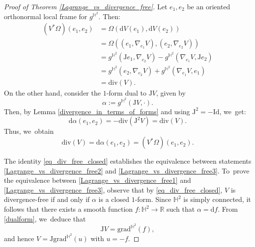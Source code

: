 \documentclass[JEP,XML,SOM,Unicode,NoEqCountersInSection, NoFloatCountersInSection,published]{cedram}
\theoremstyle{plain}
\theoremstyle{definition}
\begin{document}
\begin{proof}[Proof of Theorem \ref{Lagrange_vs_divergence_free}]
Let \(e_1, e_2 \) be an oriented orthonormal local frame for \(g^{\mathbb{H}^2} \). Then:
\begin{align*}
(V^*\Omega)(e_1, e_2)
&= \Omega(\mathrm{d}V(e_1), \mathrm{d}V(e_2)) \\
&= \Omega((e_1, \nabla_{e_1}V), (e_2, \nabla_{e_2}V)) \\
&= g^{\mathbb{H}^2}(\mathrm{J}e_1, \nabla_{e_2}V) - g^{\mathbb{H}^{2}}(\nabla_{e_1}V, \mathrm{J}e_2) \\
&= g^{\mathbb{H}^2}(e_2, \nabla_{e_2}V) + g^{\mathbb{H}^{2}}(\nabla_{e_1}V, e_1) \\
&= \mathrm{div}(V).
\end{align*}
On the other hand, consider the $1$-form dual to \(\mathrm{J}V \), given by
\begin{equation}\label{dualform}
\alpha := g^{\mathbb{H}^2}(\mathrm{J}V, \cdot).
\end{equation}
Then, by Lemma \ref{divergence_in_terms_of_forms} and using \(\mathrm{J}^2 = -\mathrm{Id} \), we~get:
\[
\mathrm{d}\alpha(e_1, e_2) = -\mathrm{div}(\mathrm{J}^2 V) = \mathrm{div}(V).
\]
Thus, we~obtain
\begin{equation}\label{eq_div_free_closed}
\mathrm{div}(V) = \mathrm{d}\alpha(e_1, e_2) = (V^*\Omega)(e_1, e_2).
\end{equation}

The identity \eqref{eq_div_free_closed} establishes the equivalence between statements \eqref{Lagrange_vs_divergence_free2} and \eqref{Lagrange_vs_divergence_free3}. To~prove the equivalence between \eqref{Lagrange_vs_divergence_free1} and \eqref{Lagrange_vs_divergence_free3}, observe that by \eqref{eq_div_free_closed}, \(V \) is divergence-free if and only if \(\alpha \) is a closed $1$-form. Since \(\mathbb{H}^2 \) is simply connected, it follows that there exists a smooth function \(f: \mathbb{H}^2 \to \mathbb{R} \) such that \(\alpha = \mathrm{d}f \). From \eqref{dualform}, we~deduce that
\[
\mathrm{J}V = \mathrm{grad}^{\mathbb{H}^2}(f),
\]
and hence \(V = \mathrm{J} \mathrm{grad}^{\mathbb{H}^2} (u) \) with \(u = -f \).
\end{proof}
\end{document}
